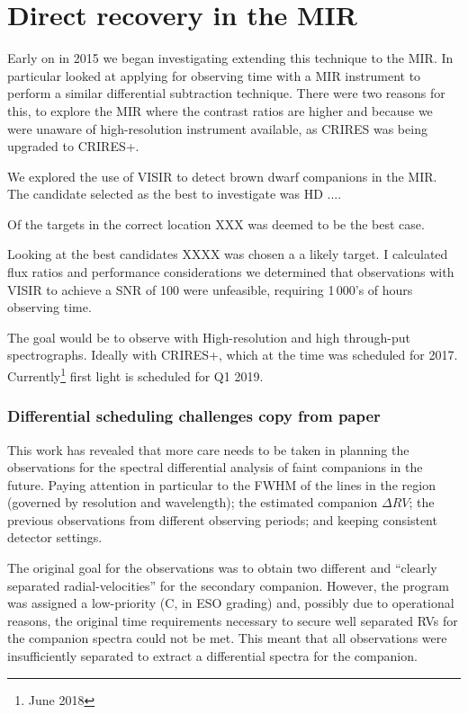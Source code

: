 \section{Direct recovery in the {MIR}}
Early on in 2015 we began investigating extending this technique to the {MIR}. In particular looked at applying for observing time with a {MIR} instrument to perform a similar differential subtraction technique.
There were two reasons for this, to explore the {MIR} where the contrast ratios are higher and because we were unaware of high-resolution \nir{} instrument available, as {CRIRES} was being upgraded to {CRIRES+}.

We explored the use of {VISIR} to detect brown dwarf companions in the {MIR}. The candidate selected as the best to investigate was HD ....


Of the targets in the correct location XXX was deemed to be the best case.

Looking at the best candidates XXXX was chosen a a likely target. I calculated flux ratios and performance considerations we determined that observations with VISIR to achieve a {SNR} of 100 were unfeasible, requiring 1\,000's of hours observing time.

The goal would be to observe with High-resolution and high through-put spectrographs. Ideally with {CRIRES+}, which at the time was scheduled for 2017. Currently\footnote{June 2018} first light is scheduled for Q1 2019.




\subsubsection{Differential scheduling challenges {copy from paper}}
\label{subsubsec:differential-schedualing}
This work has revealed that more care needs to be taken in planning the observations for the spectral differential analysis of faint companions in the future. Paying attention in particular to the {FWHM} of the lines in the region (governed by resolution and wavelength); the estimated companion \(\Delta {RV}\); the previous observations from different observing periods; and keeping consistent detector settings.

The original goal for the observations was to obtain two different and ``clearly separated radial-velocities'' for the secondary companion. However, the program was assigned a low-priority (C, in ESO grading) and, possibly due to operational reasons, the original time requirements necessary to secure well separated RVs for the companion spectra could not be met. This meant that all observations were insufficiently separated to extract a differential spectra for the companion.

